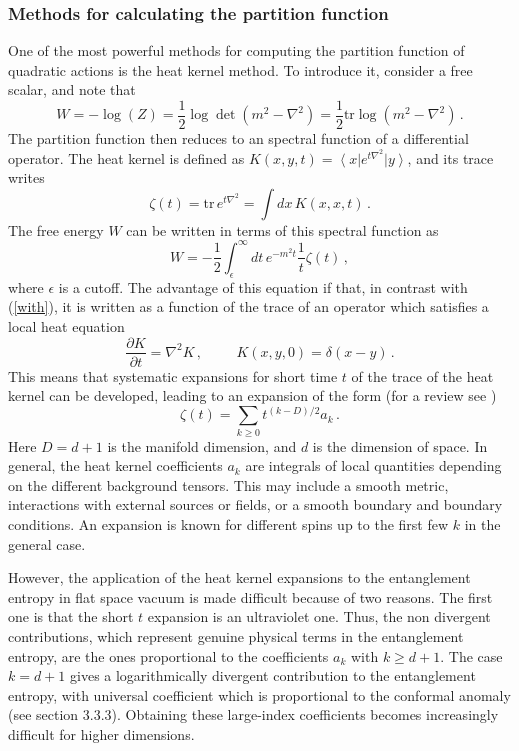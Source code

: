 \documentclass[11pt]{article}
\begin{document}
\subsubsection{Methods for calculating the partition function}
One of the most powerful methods for computing the partition function of quadratic actions is the heat kernel method. To introduce it, consider a free scalar, and note that
\begin{equation}
W=-\log(Z)=\frac{1}{2} \log \det (m^2-\nabla ^2)=\frac{1}{2}\textrm{tr}\log(m^2-\nabla ^2)\,.\label{with}
\end{equation}
The partition function then reduces to an spectral function of a differential operator. 
The heat kernel is defined as $K(x,y,t)=\left<x\right|e^{ t \nabla^2}\left|y\right>$, and its trace writes
\begin{equation}
\zeta (t)=\textrm{tr}\, e^{ t \nabla^2} =\int dx \, K(x,x,t)\,.
\end{equation}
The free energy $W$ can be written in terms of this spectral function as
\begin{equation}
W=-\frac{1}{2}\int^\infty_\epsilon dt\, e^{-m^2 t} \frac{1}{t}\zeta (t)\,,
\end{equation}
where $\epsilon$ is a cutoff. 
The advantage of this equation if that, in contrast with (\ref{with}), it is written as a function of the trace of an operator which satisfies a local heat equation
\begin{equation}
\frac{\partial K}{\partial t}=\nabla^2 K\,, \hspace{1cm} K(x,y,0)=\delta(x-y)\,.
\end{equation}
This means that systematic expansions for short time $t$ of the trace of the heat kernel can be developed, leading to an expansion of the form (for a review see \cite{vasi})
\begin{equation}
\zeta (t)=\sum_{k\ge 0} t^{(k-D)/2} a_k\,.\label{ggg}
\end{equation}
Here $D=d+1$ is the manifold dimension, and $d$ is the dimension of space. In general, the heat kernel coefficients $a_k$ are integrals of local quantities depending on the different background tensors. This may include a smooth metric, interactions with external sources or fields, or a smooth boundary and boundary conditions. An expansion is known for different spins up to the first few $k$ in the general case.  

However, the application of the heat kernel expansions to the entanglement entropy in flat space vacuum is made difficult because of two reasons.  
The first one is that the short $t$ expansion is an ultraviolet one. Thus, the non divergent contributions, which represent genuine physical terms in the entanglement entropy, are the ones proportional to the coefficients $a_k$ with $k\ge d+1$. The case $k=d+1$ gives a logarithmically divergent contribution to the entanglement entropy, with universal coefficient which is proportional to the conformal anomaly (see section 3.3.3). Obtaining  these large-index coefficients becomes increasingly difficult for higher dimensions. 
\end{document}
